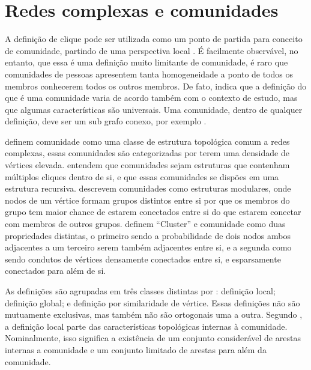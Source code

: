 \documentclass[notes.tex]{subfiles}
\begin{document}
\section{Redes complexas e comunidades\label{sec:redes_complexas}}

A definição de clique pode ser utilizada como um ponto de partida para conceito de comunidade, partindo de uma perspectiva local \cite{fortunato2010community}.
É facilmente observável, no entanto, que essa é uma definição muito limitante de comunidade, é raro que comunidades de pessoas apresentem tanta homogeneidade a ponto de todos os membros conhecerem todos os outros membros.
De fato,  indica que a definição do que é uma comunidade varia de acordo também com o contexto de estudo, mas que algumas características são universais.
Uma comunidade, dentro de qualquer definição, deve ser um sub grafo conexo, por exemplo \cite{fortunato2010community}. 

 definem comunidade como uma classe de estrutura topológica comum a redes complexas, essas comunidades são categorizadas por terem uma densidade de vértices elevada.
 entendem que comunidades sejam estruturas que contenham múltiplos cliques dentro de si, e que essas comunidades se dispões em uma estrutura recursiva.
 descrevem comunidades como estruturas modulares, onde nodos de um vértice formam grupos distintos entre si por que os membros do grupo tem maior chance de estarem conectados entre si do que estarem conectar com membros de outros grupos.
 definem ``Cluster'' e comunidade como duas propriedades distintas, o primeiro sendo a probabilidade de dois nodos ambos adjacentes a um terceiro serem também adjacentes entre si, e a segunda como sendo condutos de vértices densamente conectados entre si, e esparsamente conectados para além de si.

As definições são agrupadas em três classes distintas por : definição local; definição global; e definição por similaridade de vértice.
Essas definições não são mutuamente exclusivas, mas também não são ortogonais uma a outra.
Segundo , a definição local parte das características topológicas internas à comunidade.
Nominalmente, isso significa a existência de um conjunto considerável de arestas internas a comunidade e um conjunto limitado de arestas para além da comunidade.
\end{document}
